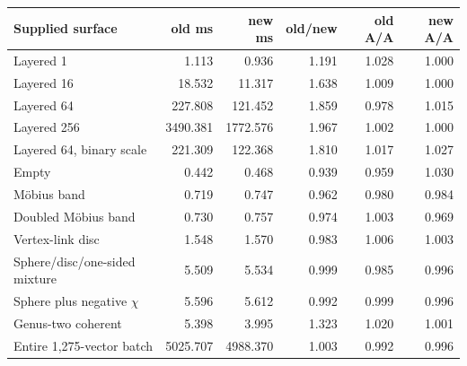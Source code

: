 \begin{center}
\small
\begin{tabular}{lrrrrr}
\toprule
Supplied surface & old ms & new ms & old/new & old A/A & new A/A\\
\midrule
Layered 1 & 1.113 & 0.936 & 1.191 & 1.028 & 1.000\\
Layered 16 & 18.532 & 11.317 & 1.638 & 1.009 & 1.000\\
Layered 64 & 227.808 & 121.452 & 1.859 & 0.978 & 1.015\\
Layered 256 & 3490.381 & 1772.576 & 1.967 & 1.002 & 1.000\\
Layered 64, binary scale & 221.309 & 122.368 & 1.810 & 1.017 & 1.027\\
Empty & 0.442 & 0.468 & 0.939 & 0.959 & 1.030\\
M\"obius band & 0.719 & 0.747 & 0.962 & 0.980 & 0.984\\
Doubled M\"obius band & 0.730 & 0.757 & 0.974 & 1.003 & 0.969\\
Vertex-link disc & 1.548 & 1.570 & 0.983 & 1.006 & 1.003\\
Sphere/disc/one-sided mixture & 5.509 & 5.534 & 0.999 & 0.985 & 0.996\\
Sphere plus negative $\chi$ & 5.596 & 5.612 & 0.992 & 0.999 & 0.996\\
Genus-two coherent & 5.398 & 3.995 & 1.323 & 1.020 & 1.001\\
Entire 1,275-vector batch & 5025.707 & 4988.370 & 1.003 & 0.992 & 0.996\\
\bottomrule
\end{tabular}
\end{center}
